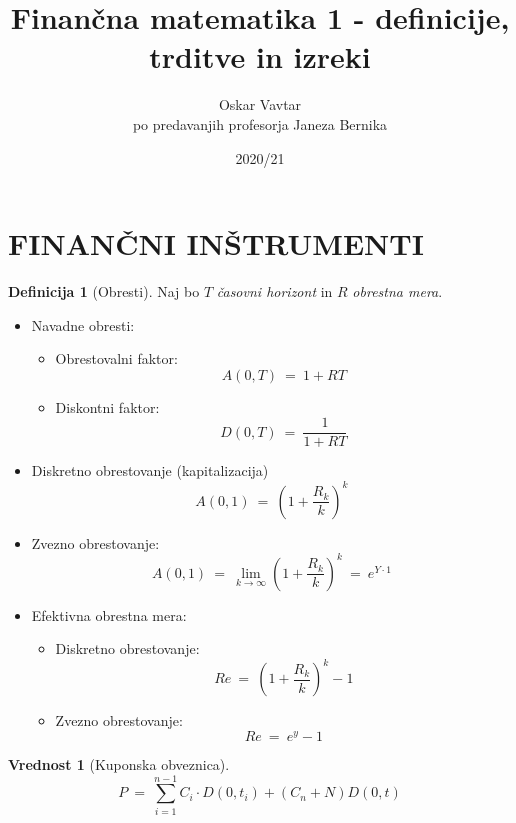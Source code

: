 \documentclass[11pt]{article}
\title{Finančna matematika 1 - definicije, trditve in izreki}
\author{Oskar Vavtar \\
po predavanjih profesorja Janeza Bernika}
\date{2020/21}
\theoremstyle{definition}
\newtheorem{definicija}{Definicija}[section]
\theoremstyle{definition}
\newtheorem{vrednost}{Vrednost}
\begin{document}
\maketitle
\pagebreak
\tableofcontents
\pagebreak


\section{FINANČNI INŠTRUMENTI}
\vspace{0.5cm}

\begin{definicija}[Obresti]

Naj bo $T$ \textit{časovni horizont} in $R$ \textit{obrestna mera}.

\begin{itemize}

	\item Navadne obresti: 
	\begin{itemize}
		\item Obrestovalni faktor:
		$$A(0, T) ~=~ 1 + RT$$
		\item Diskontni faktor:
		$$D(0, T) ~=~ \frac{1}{1 + RT}$$
	\end{itemize}
	
	\item Diskretno obrestovanje (kapitalizacija)
	$$A(0, 1) ~=~ \left( 1 + \frac{R_k}{k} \right)^k$$
	
	\item Zvezno obrestovanje: 
	$$A(0, 1) ~=~ \lim_{k \rightarrow \infty} \left( 1 + \frac{R_k}{k} \right)^k ~=~ e^{Y \cdot 1}$$	
	
	\item Efektivna obrestna mera:
	\begin{itemize}
		\item Diskretno obrestovanje:
		$$Re ~=~ \left( 1 + \frac{R_k}{k} \right)^k - 1$$
		\item Zvezno obrestovanje:
		$$Re ~=~ e^y - 1$$
	\end{itemize}
	

\end{itemize}

\end{definicija}
\vspace{0.5cm}

\begin{vrednost}[Kuponska obveznica]

$$P ~=~ \sum_{i=1}^{n-1} C_i \cdot D(0, t_i) + (C_n + N) D(0, t)$$

\end{vrednost}
\vspace{0.5cm}
\end{document}
